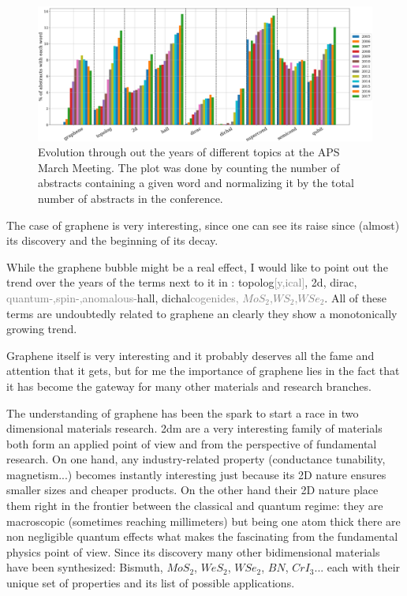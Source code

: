 \begin{figure}[h!]
\centering
\includegraphics{introduction/figures/topics.png}
\vspace{-25pt}
\caption{Evolution through out the years of different topics at the APS March Meeting. The plot was done by counting the number of abstracts containing a given word and normalizing it by the total number of abstracts in the conference.}
\label{topics}
\end{figure}

The case of graphene is very interesting, since one can see its raise since (almost) its discovery and the beginning of its decay.

While the graphene bubble might be a real effect, I would like to point out the trend over the years of the terms next to it in : topolog\textcolor{gray}{[y,ical]}, 2d, dirac, \textcolor{gray}{quantum-,spin-,anomalous-}hall, dichal\textcolor{gray}{cogenides, $MoS_2$,$WS_2$,$WSe_2$}. All of these terms are undoubtedly related to graphene an clearly they show a monotonically growing trend.
\medskip

Graphene itself is very interesting and it probably deserves all the fame and attention that it gets, but for me the importance of graphene lies in the fact that it has become the gateway for many other materials and research branches.

The understanding of graphene has been the spark to start a race in two dimensional materials research. \ac{2dm} are a very interesting family of materials both form an applied point of view and from the perspective of fundamental research.
On one hand, any industry-related property (conductance tunability, magnetism...) becomes instantly interesting just because its 2D nature ensures smaller sizes and cheaper products.
On the other hand their 2D nature place them right in the frontier between the classical and quantum regime: they are macroscopic (sometimes reaching millimeters) but being one atom thick there are non negligible quantum effects what makes the fascinating from the fundamental physics point of view.
Since its discovery many other bidimensional materials have been synthesized: Bismuth, $MoS_2$, $WeS_2$, $WSe_2$, $BN$, $CrI_3$... each with their unique set of properties and its list of possible applications.

